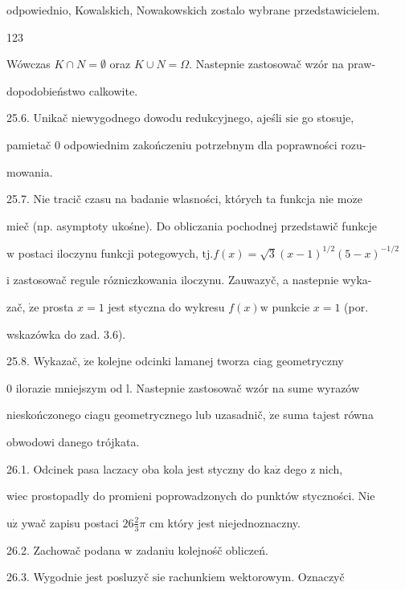 \documentclass[a4paper,12pt]{article}
\begin{document}
odpowiednio, Kowalskich, Nowakowskich zostalo wybrane przedstawicielem.





123

Wówczas $ K\cap N=\emptyset$ oraz $ K\cup N=\Omega$. Nastepnie zastosowač wzór na praw-

dopodobieństwo calkowite.

25.6. Unikač niewygodnego dowodu redukcyjnego, ajeśli $\mathrm{s}\mathrm{i}\mathrm{e}$ go stosuje,

pamietač $0$ odpowiednim zakończeniu potrzebnym dla poprawności rozu-

mowania.

25.7. Nie tracič czasu na badanie wlasności, których ta funkcja nie $\mathrm{m}\mathrm{o}\dot{\mathrm{z}}\mathrm{e}$

mieč (np. asymptoty ukośne). Do obliczania pochodnej przedstawič funkcje

$\mathrm{w}$ postaci iloczynu funkcji potegowych, $\mathrm{t}\mathrm{j}. f(x)=\sqrt{3}(x-1)^{1/2}(5-x)^{-1/2}$

$\mathrm{i}$ zastosowač regule rózniczkowania iloczynu. Zauwazyč, a nastepnie wyka-

zač, $\dot{\mathrm{z}}\mathrm{e}$ prosta $x= 1$ jest styczna do wykresu $f(x) \mathrm{w}$ punkcie $x= 1$ (por.

wskazówka do $\mathrm{z}\mathrm{a}\mathrm{d}$. 3.6).

25.8. Wykazač, $\dot{\mathrm{z}}\mathrm{e}$ kolejne odcinki lamanej tworza ciag geometryczny

$0$ ilorazie mniejszym od l. Nastepnie zastosowač wzór na sume wyrazów

nieskończonego ciagu geometrycznego lub uzasadnič, $\dot{\mathrm{z}}\mathrm{e}$ suma tajest równa

obwodowi danego trójkata.

26.1. Odcinek pasa laczacy oba kola jest styczny do $\mathrm{k}\mathrm{a}\dot{\mathrm{z}}$ dego $\mathrm{z}$ nich,

wiec prostopadly do promieni poprowadzonych do punktów styczności. Nie

$\mathrm{u}\dot{\mathrm{z}}$ ywač zapisu postaci $ 26\displaystyle \frac{2}{3}\pi$ cm który jest niejednoznaczny.

26.2. Zachowač podana $\mathrm{w}$ zadaniu kolejnośč obliczeń.

26.3. Wygodnie jest posluzyč $\mathrm{s}\mathrm{i}\mathrm{e}$ rachunkiem wektorowym. Oznaczyč
\end{document}
